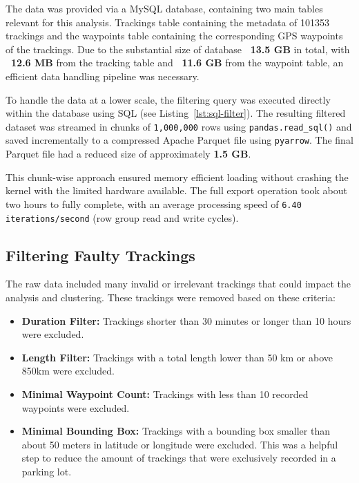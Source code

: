 \documentclass[a4paper,12pt,twoside]{scrreprt}
\begin{document}
The data was provided via a MySQL database, containing two main tables relevant
for this analysis.
Trackings table containing the metadata of 101353 trackings and the waypoints
table containing the corresponding GPS waypoints of the trackings.
Due to the substantial size of database \textbf{~13.5 GB} in total, with
\textbf{~12.6 MB} from the tracking table and \textbf{~11.6 GB} from the
waypoint table,
an efficient data handling pipeline was necessary.

To handle the data at a lower scale, the filtering query was executed directly
within the database using SQL (see Listing~\ref{lst:sql-filter}). The resulting
filtered dataset was streamed in chunks of \texttt{1,000,000} rows using
\texttt{pandas.read\_sql()} and saved incrementally to a compressed Apache
Parquet file using \texttt{pyarrow}. The final Parquet file had a reduced size
of approximately \textbf{1.5 GB}.

This chunk-wise approach ensured memory efficient loading without crashing the
kernel with the limited hardware available.
The full export operation took about two hours to fully complete, with an
average processing speed of \texttt{6.40 iterations/second} (row group read and
write cycles).

\subsection{Filtering Faulty Trackings}
The raw data included many invalid or irrelevant trackings that could impact
the analysis and clustering. These trackings were removed based on these
criteria:

\begin{itemize}
  \item \textbf{Duration Filter:} Trackings shorter than 30 minutes or longer
        than 10 hours were excluded.
  \item \textbf{Length Filter:} Trackings with a total length lower than 50 km
        or above 850km were excluded.
  \item \textbf{Minimal Waypoint Count:} Trackings with less than 10 recorded
        waypoints were excluded.
  \item \textbf{Minimal Bounding Box:} Trackings with a bounding box smaller
        than about 50 meters in latitude or longitude were excluded. This was a
        helpful
        step to reduce the amount of trackings that were exclusively recorded
        in a
        parking lot.
\end{itemize}
\end{document}
